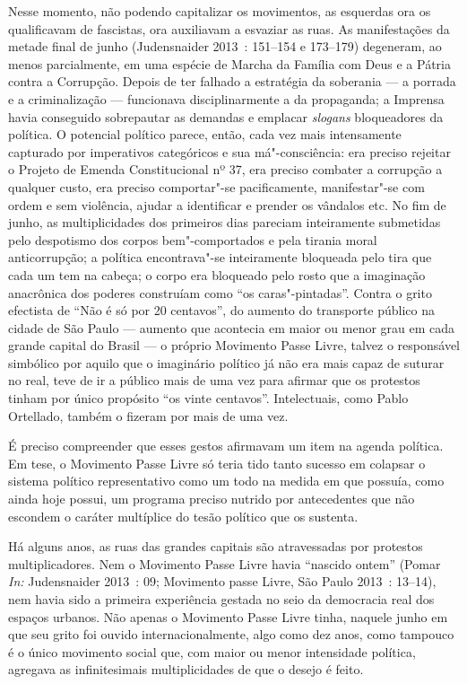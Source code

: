 Nesse momento, não podendo capitalizar os movimentos, as esquerdas ora
os qualificavam de fascistas, ora auxiliavam a esvaziar as ruas. As
manifestações da metade final de junho (Judensnaider 2013~: 151--154 e
173--179) degeneram, ao menos parcialmente, em uma espécie de Marcha da
Família com Deus e a Pátria contra a Corrupção. Depois de ter falhado a
estratégia da soberania --- a porrada e a criminalização --- funcionava
disciplinarmente a da propaganda; a Imprensa havia conseguido
sobrepautar as demandas e emplacar \emph{slogans }bloqueadores da
política. O potencial político parece, então, cada vez mais intensamente
capturado por imperativos categóricos e sua má"-consciência: era preciso
rejeitar o Projeto de Emenda Constitucional nº 37, era preciso combater
a corrupção a qualquer custo, era preciso comportar"-se pacificamente,
manifestar"-se com ordem e sem violência, ajudar a identificar e prender
os vândalos etc. No fim de junho, as multiplicidades dos primeiros dias
pareciam inteiramente submetidas pelo despotismo dos corpos
bem"-comportados e pela tirania moral anticorrupção; a política
encontrava"-se inteiramente bloqueada pelo tira que cada um tem na
cabeça; o corpo era bloqueado pelo rosto que a imaginação anacrônica dos
poderes construíam como ``os caras"-pintadas''. Contra o grito efectista
de ``Não é só por 20 centavos'', do aumento do transporte público na
cidade de São Paulo --- aumento que acontecia em maior ou menor grau em
cada grande capital do Brasil --- o próprio Movimento Passe Livre, talvez
o responsável simbólico por aquilo que o imaginário político já não era
mais capaz de suturar no real, teve de ir a público mais de uma vez para
afirmar que os protestos tinham por único propósito ``os vinte
centavos''. Intelectuais, como Pablo Ortellado, também o fizeram por
mais de uma vez.

É preciso compreender que esses gestos afirmavam um item na agenda
política. Em tese, o Movimento Passe Livre só teria tido tanto sucesso
em colapsar o sistema político representativo como um todo na medida em
que possuía, como ainda hoje possui, um programa preciso nutrido por
antecedentes que não escondem o caráter multíplice do tesão político que
os sustenta.

Há alguns anos, as ruas das grandes capitais são atravessadas por
protestos multiplicadores. Nem o Movimento Passe Livre havia ``nascido
ontem'' (Pomar \emph{In: }Judensnaider 2013~: 09; Movimento passe Livre,
São Paulo 2013~: 13--14), nem havia sido a primeira experiência gestada
no seio da democracia real dos espaços urbanos. Não apenas o Movimento
Passe Livre tinha, naquele junho em que seu grito foi ouvido
internacionalmente, algo como dez anos, como tampouco é o único
movimento social que, com maior ou menor intensidade política, agregava
as infinitesimais multiplicidades de que o desejo é feito.

